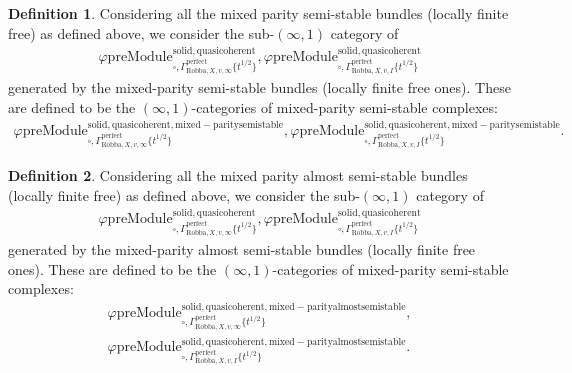 \documentclass[12pt]{book}
\theoremstyle{definition}
\newtheorem{definition}{Definition}
\begin{document}
\begin{definition}
Considering all the mixed parity semi-stable bundles (locally finite free) as defined above, we consider the sub-$(\infty,1)$ category of 
\begin{align}
\varphi\mathrm{preModule}^\mathrm{solid,quasicoherent}_{\square,\Gamma^\mathrm{perfect}_{\text{Robba},X,v,\infty}\{t^{1/2}\}},
\varphi\mathrm{preModule}^\mathrm{solid,quasicoherent}_{\square,\Gamma^\mathrm{perfect}_{\text{Robba},X,v,I}\{t^{1/2}\}} 
\end{align}
generated by the mixed-parity semi-stable bundles (locally finite free ones). These are defined to be the $(\infty,1)$-categories of mixed-parity semi-stable complexes:
\begin{align}
\varphi\mathrm{preModule}^\mathrm{solid,quasicoherent,mixed-paritysemistable}_{\square,\Gamma^\mathrm{perfect}_{\text{Robba},X,v,\infty}\{t^{1/2}\}},
\varphi\mathrm{preModule}^\mathrm{solid,quasicoherent,mixed-paritysemistable}_{\square,\Gamma^\mathrm{perfect}_{\text{Robba},X,v,I}\{t^{1/2}\}}. 
\end{align}
\end{definition}


\begin{definition}
Considering all the mixed parity almost semi-stable bundles (locally finite free) as defined above, we consider the sub-$(\infty,1)$ category of 
\begin{align}
\varphi\mathrm{preModule}^\mathrm{solid,quasicoherent}_{\square,\Gamma^\mathrm{perfect}_{\text{Robba},X,v,\infty}\{t^{1/2}\}},
\varphi\mathrm{preModule}^\mathrm{solid,quasicoherent}_{\square,\Gamma^\mathrm{perfect}_{\text{Robba},X,v,I}\{t^{1/2}\}} 
\end{align}
generated by the mixed-parity almost semi-stable bundles (locally finite free ones). These are defined to be the $(\infty,1)$-categories of mixed-parity semi-stable complexes:
\begin{align}
\varphi\mathrm{preModule}^\mathrm{solid,quasicoherent,mixed-parityalmostsemistable}_{\square,\Gamma^\mathrm{perfect}_{\text{Robba},X,v,\infty}\{t^{1/2}\}},\\
\varphi\mathrm{preModule}^\mathrm{solid,quasicoherent,mixed-parityalmostsemistable}_{\square,\Gamma^\mathrm{perfect}_{\text{Robba},X,v,I}\{t^{1/2}\}}. 
\end{align}
\end{definition}
\end{document}
